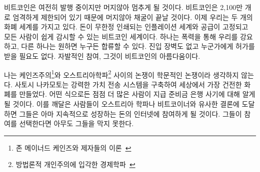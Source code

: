 \begin{comment}
	While Bitcoin is still inflationary, it will cease to be so rather soon.
	The strictly limited supply of 21 million bitcoins will eventually do
	away with inflation completely. We now have two monetary worlds: an
	inflationary one where money is printed arbitrarily, and the world of
	Bitcoin, where final supply is fixed and easily auditable for everyone.
	One is forced upon us by violence, the other can be joined by anyone who
	wishes to do so. No barriers to entry, no one to ask for permission.
	Voluntary participation. That is the beauty of Bitcoin.
\end{comment}
비트코인은 여전히 발행 중이지만 머지않아 멈추게 될 것이다. 
비트코인은 2,100만 개로 엄격하게 제한되어 있기 때문에 머지않아 채굴이 끝날 것이다.
이제 우리는 두 개의 화폐 세계를 가지고 있다. 
돈이 무한정 인쇄되는 인플레이션 세계와 공급이 고정되고 모든 사람이 쉽게 감시할 수 있는 비트코인 세계이다. 
하나는 폭력을 통해 우리를 강요하고,
다른 하나는 원하면 누구든 합류할 수 있다.
진입 장벽도 없고 누군가에게 허가를 받을 필요도 없다. 
자발적인 참여, 그것이 비트코인의 아름다움이다.

\begin{comment}
	I would argue that the argument between Keynesian\footnote{Theories according to
		John Maynard Keynes and his deciples~\cite{wiki:keynesian}} and
	Austrian\footnote{School of economic thought based on methodological
		individualism~\cite{wiki:austrian}} economists is no longer purely academical.
	Satoshi managed to build a system for value transfer on steroids, creating the
	soundest money which ever existed in the process. One way or another, more and
	more people will learn about the scam which is fractional reserve banking. If
	they come to similar conclusions as most Austrians and Bitcoiners, they might
	join the ever-growing internet of money. Nobody can stop them if they choose to
	do so.
\end{comment}
나는 케인즈주의\footnote{존 메이너드 케인즈와 제자들의 이론~\cite{wiki:keynesian}}와 오스트리아학파\footnote{방법론적 개인주의에 입각한 경제학파~\cite{wiki:austrian}} 사이의 논쟁이 학문적인 논쟁이라 생각하지 않는다. 
사토시 나카모토는 강력한 가치 전송 시스템을 구축하여 세상에서 가장 건전한 화폐를 만들었다. 
어떤 식으로든 점점 더 많은 사람이 지급 준비금 은행 사기에 대해 알게 될 것이다. 
이를 깨달은 사람들이 오스트리아 학파나 비트코이너와 유사한 결론에 도달하면 
그들은 아마 지속적으로 성장하는 돈의 인터넷에 참여하게 될 것이다. 
그들이 참여를 선택한다면 아무도 그들을 막지 못한다.

